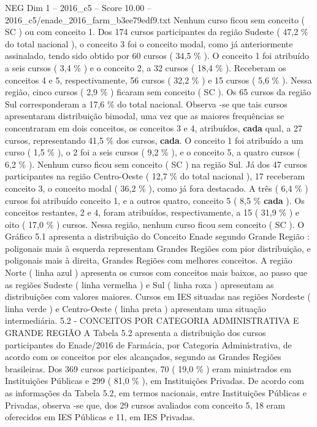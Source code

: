 \begin{textsample}{NEG Dim 1 – 2016\_c5 – Score 10.00 – 2016\_c5/enade\_2016\_farm\_b3ee79edf9.txt}
Nenhum curso ficou sem conceito ( SC ) ou com conceito 1.
Dos 174 cursos participantes da região Sudeste ( 47,2 \% do total nacional ), o conceito 3 foi o conceito modal, como já anteriormente assinalado, tendo sido obtido por 60 cursos ( 34,5 \% ).
O conceito 1 foi atribuído a seis cursos ( 3,4 \% ) e o conceito 2, a 32 cursos ( 18,4 \% ).
Receberam os conceitos 4 e 5, respectivamente, 56 cursos ( 32,2 \% ) e 15 cursos ( 5,6 \% ).
Nessa região, cinco cursos ( 2,9 \% ) ficaram sem conceito ( SC ).
Os 65 cursos da região Sul corresponderam a 17,6 \% do total nacional.
Observa -se que tais cursos apresentaram distribuição bimodal, uma vez que as maiores frequências se concentraram em dois conceitos, os conceitos 3 e 4, atribuídos, \textbf{cada} qual, a 27 cursos, representando 41,5 \% dos cursos, \textbf{cada}.
O conceito 1 foi atribuído a um curso ( 1,5 \% ), o 2 foi a seis cursos ( 9,2 \% ), e o conceito 5, a quatro cursos ( 6,2 \% ).
Nenhum curso ficou sem conceito ( SC ) na região Sul.
Já dos 47 cursos participantes na região Centro-Oeste ( 12,7 \% do total nacional ), 17 receberam conceito 3, o conceito modal ( 36,2 \% ), como já fora destacado.
A três ( 6,4 \% ) cursos foi atribuído conceito 1, e a outros quatro, conceito 5 ( 8,5 \% \textbf{cada} ).
Os conceitos restantes, 2 e 4, foram atribuídos, respectivamente, a 15 ( 31,9 \% ) e oito ( 17,0 \% ) cursos.
Nessa região, nenhum curso ficou sem conceito ( SC ).
O Gráfico 5.1 apresenta a distribuição do Conceito Enade segundo Grande Região : poligonais mais à esquerda representam Grandes Regiões com pior distribuição, e poligonais mais à direita, Grandes Regiões com melhores conceitos.
A região Norte ( linha azul ) apresenta os cursos com conceitos mais baixos, ao passo que as regiões Sudeste ( linha vermelha ) e Sul ( linha roxa ) apresentam as distribuições com valores maiores.
Cursos em IES situadas nas regiões Nordeste ( linha verde ) e Centro-Oeste ( linha preta ) apresentam uma situação intermediária. 5.2 - CONCEITOS POR CATEGORIA ADMINISTRATIVA E GRANDE REGIÃO A Tabela 5.2 apresenta a distribuição dos cursos participantes do Enade/2016 de Farmácia, por Categoria Administrativa, de acordo com os conceitos por eles alcançados, segundo as Grandes Regiões brasileiras.
Dos 369 cursos participantes, 70 ( 19,0 \% ) eram ministrados em Instituições Públicas e 299 ( 81,0 \% ), em Instituições Privadas.
De acordo com as informações da Tabela 5.2, em termos nacionais, entre Instituições Públicas e Privadas, observa -se que, dos 29 cursos avaliados com conceito 5, 18 eram oferecidos em IES Públicas e 11, em IES Privadas.

\end{textsample}
